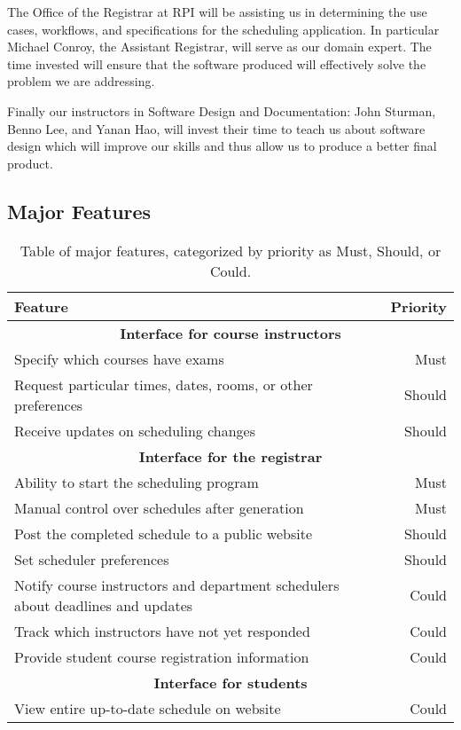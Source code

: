 \documentclass[11pt]{article}
\begin{document}
The Office of the Registrar at RPI will be assisting us in determining the use cases, workflows, and specifications for the scheduling application.  In particular Michael Conroy, the Assistant Registrar, will serve as our domain expert. The time invested will ensure that the software produced will effectively solve the problem we are addressing.

Finally our instructors in Software Design and Documentation: John Sturman, Benno Lee, and Yanan Hao, will invest their time to teach us about software design which will improve our skills and thus allow us to produce a better final product.


\subsection{Major Features} %
\begin{table}[htbp]
  \centering
  \begin{tabular} {| l | r |}
    \hline
    \textbf{Feature} & \textbf{Priority} \\ \hline \hline
    \multicolumn{2}{|c|}{\textbf{Interface for course instructors}} \\ \hline
    Specify which courses have exams & Must \\ \hline
    Request particular times, dates, rooms, or other preferences & Should \\ \hline
    Receive updates on scheduling changes & Should \\ \hline
    \multicolumn{2}{|c|}{\textbf{Interface for the registrar}} \\ \hline
    Ability to start the scheduling program & Must \\ \hline
    Manual control over schedules after generation & Must \\ \hline
    Post the completed schedule to a public website & Should \\ \hline
    Set scheduler preferences & Should \\ \hline
    Notify course instructors and department schedulers about deadlines and updates & Could \\ \hline
    Track which instructors have not yet responded & Could \\ \hline
    Provide student course registration information & Could \\ \hline %
    \multicolumn{2}{|c|}{\textbf{Interface for students}} \\ \hline
    View entire up-to-date schedule on website & Could \\ \hline
  \end{tabular}
  \caption{Table of major features, categorized by priority as Must, Should, or Could.}
\end{table}
\end{document}
